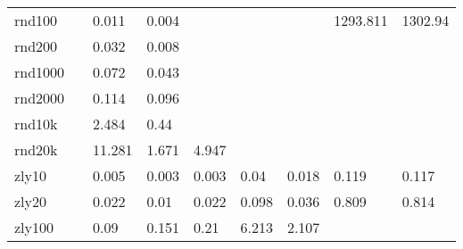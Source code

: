 \begin{table}[h]
\begin{tabular}{lllllllll}
		rnd100  &       & 0.011  & 0.004   &          &            &            & 1293.811 & 1302.94 \\
		rnd200  &       & 0.032  & 0.008   &          &            &            &          &         \\
		rnd1000 &       & 0.072  & 0.043   &          &            &            &          &         \\
		rnd2000 &       & 0.114  & 0.096   &          &            &            &          &         \\
		rnd10k  &       & 2.484  & 0.44    &          &            &            &          &         \\
		rnd20k  &       & 11.281 & 1.671   & 4.947    &            &            &          &         \\
		zly10   &       & 0.005  & 0.003   & 0.003    & 0.04       & 0.018      & 0.119    & 0.117   \\
		zly20   &       & 0.022  & 0.01    & 0.022    & 0.098      & 0.036      & 0.809    & 0.814   \\
		zly100  &       & 0.09   & 0.151   & 0.21     & 6.213      & 2.107      &          &         \\ \hline
	\end{tabular}
\end{table}

